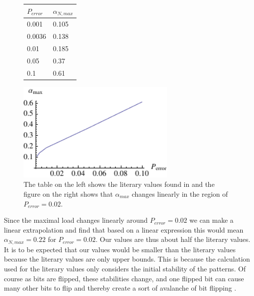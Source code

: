 \begin{figure}[htb] 
\centering
\begin{minipage}[c]{0.3\textwidth}
\centering 
\begin{tabular}{|l|l|}
\hline
$P_{error}$ & $\alpha_{N,max}$ \\ \hline \hline
0.001 & 0.105 \\
0.0036 & 0.138 \\
0.01 & 0.185 \\
0.05 & 0.37 \\
0.1 & 0.61 \\
\hline
\end{tabular}
\label{tbl:exercise2_lit_value}
\end{minipage}
\begin{minipage}[c]{0.69\textwidth}
\centering
\includegraphics[width=0.69\textwidth]{dat/theovalues.pdf}
\end{minipage}
\caption{ The table on the left shows the literary values found in \citep{Hertz1991} and the figure on the right shows that $\alpha_{max}$ changes linearly in the region of $P_{error}=0.02$.}
\end{figure}




Since the maximal load changes linearly around $P_{error}=0.02$ we can make a linear extrapolation and find that based on a linear expression this would mean $\alpha_{N,max} = 0.22$ for $P_{error}=0.02$. Our values are thus about half the literary values. It is to be expected that our values would be smaller than the literary values because the literary values are only upper bounds. This is because the calculation used for the literary values only considers the initial stability of the patterns. Of course as bits are flipped, these stabilities change, and one flipped bit can cause many other bits to flip and thereby create a sort of avalanche of bit flipping \citep[P. 19]{Hertz1991}. 